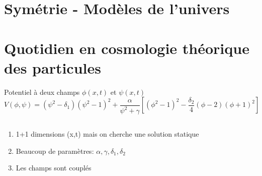 \documentclass[handout]{beamer}
\begin{document}
\section{Symétrie - Modèles de l'univers }
\begin{frame}

\end{frame}






\section{Quotidien en cosmologie théorique des particules}
\begin{frame}
\begin{block}{Potentiel à deux champs $\phi(x,t)$ et $\psi(x,t)$}
\begin{equation*}
V(\phi,\psi)=(\psi^2-\delta_1)(\psi^2-1)^2+\frac{\alpha}{\psi^2+\gamma}[(\phi^2-1)^2 - \frac{\delta_2}{4}(\phi-2)(\phi+1)^2] 
\end{equation*}
\begin{columns}
    \begin{column}{.5\linewidth}
  
\begin{enumerate}
\item 1+1 dimensions (x,t) mais on cherche une solution statique
\item Beaucoup de paramètres: $\alpha, \gamma, \delta_1, \delta_2$
\item Les champs sont couplés
\end{enumerate}  
    \end{column}
    \begin{column}{.5\linewidth}
    \begin{figure}[0.3\textwidth]
    \end{figure}
    \end{column}
  \end{columns}
\end{block}
\end{frame}
\end{document}
